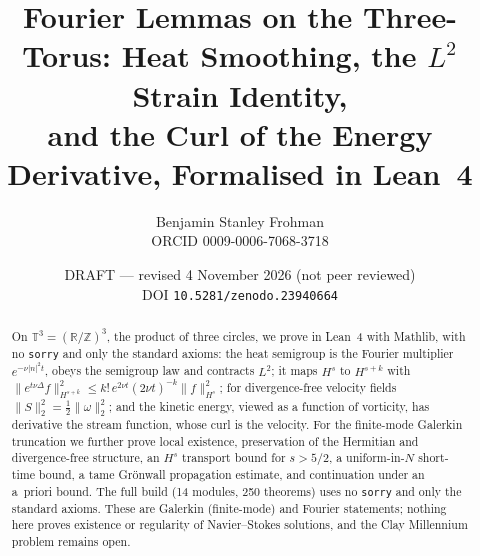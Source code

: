 \documentclass[11pt]{article}
\title{Fourier Lemmas on the Three-Torus: Heat Smoothing, the $L^2$ Strain Identity,\\ and the Curl of the Energy Derivative, Formalised in Lean~4}
\author{Benjamin Stanley Frohman\\ORCID 0009-0006-7068-3718}
\date{DRAFT --- revised 4 November 2026 (not peer reviewed)\\ DOI \texttt{10.5281/zenodo.23940664}}
\theoremstyle{remark}\newtheorem*{commentary}{Commentary}
\begin{document}
\maketitle

\begin{abstract}
On $\mathbb T^3=(\mathbb R/\mathbb Z)^3$, the product of three circles, we prove in Lean~4 with Mathlib,
with no \texttt{sorry} and only the standard axioms: the heat semigroup is the Fourier multiplier
$e^{-\nu|n|^2t}$, obeys the semigroup law and contracts $L^2$; it maps $H^s$ to $H^{s+k}$ with
$\|e^{t\nu\Delta}f\|_{H^{s+k}}^2\le k!\,e^{2\nu t}(2\nu t)^{-k}\|f\|_{H^s}^2$; for divergence-free
velocity fields $\|S\|_2^2=\tfrac12\|\omega\|_2^2$; and the kinetic energy, viewed as a function of
vorticity, has derivative the stream function, whose curl is the velocity. For the finite-mode Galerkin truncation we further prove local existence,
preservation of the Hermitian and divergence-free structure, an $H^s$ transport bound for $s>5/2$,
a uniform-in-$N$ short-time bound, a tame Gr\"onwall propagation estimate, and continuation under an
a~priori bound. The full build (14 modules, 250 theorems) uses no \texttt{sorry} and only the standard
axioms. These are Galerkin (finite-mode) and Fourier statements; nothing here proves existence or regularity
of Navier--Stokes solutions, and the Clay Millennium problem remains open.
\end{abstract}
\end{document}
